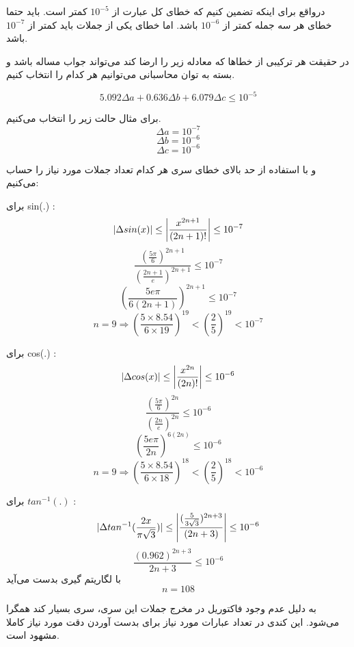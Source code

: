 درواقع برای اینکه تضمین کنیم که خطای کل عبارت از $10^{-5}$ کمتر است. باید حتما خطای هر سه جمله کمتر از $10^{-6}$ باشد. اما خطای یکی از جملات باید کمتر از $10^{-7}$ باشد.

در حقیقت هر ترکیبی از خطاها که معادله زیر را ارضا کند می‌تواند جواب مساله باشد و بسته به توان محاسبانی می‌توانیم هر کدام را انتخاب کنیم.

$$5.092 \Delta a + 0.636 \Delta b + 6.079 \Delta c  \leq 10^{-5}$$

برای مثال حالت زیر را انتخاب می‌کنیم.
$$\Delta a  = 10^{-7}$$
$$\Delta b = 10^{-6}$$
$$\Delta c = 10^{-6}$$

و با استفاده از حد بالای خطای سری هر کدام تعداد جملات مورد نیاز را حساب می‌کنیم:

برای sin(.) :
$$|\Delta sin(x)| \leq \abs{\frac{x^{2n+1}}{(2n+1)!}} \leq 10^{-7}$$
$$\frac{(\frac{5\pi}{6})^{2n+1}}{(\frac{2n+1}{e})^{2n+1}} \leq 10^{-7}$$
$$(\frac{5e\pi}{6(2n+1)})^{2n+1} \leq 10^{-7}$$
$$n=9 \Rightarrow (\frac{5 \times 8.54}{6 \times 19})^{19} < (\frac{2}{5})^{19} < 10^{-7}$$

برای cos(.) : 
$$|\Delta cos(x)| \leq \abs{\frac{x^{2n}}{(2n)!}} \leq 10^{-6}$$
$$\frac{(\frac{5\pi}{6})^{2n}}{(\frac{2n}{e})^{2n}} \leq 10^{-6}$$
$$(\frac{5e\pi}{2n})^{6(2n)} \leq 10^{-6}$$
$$n=9 \Rightarrow (\frac{5 \times 8.54}{6 \times 18})^{18} < (\frac{2}{5})^{18} < 10^{-6}$$

برای $tan^{-1}(.)$ :
$$|\Delta tan^{-1}(\frac{2x}{\pi \sqrt{3}})| \leq \abs{\frac{(\frac{5}{3\sqrt{3}})^{2n+3}}{(2n+3)}} \leq 10^{-6}$$
$$\frac{(0.962)^{2n+3}}{2n+3} \leq 10^{-6}$$
با لگاریتم گیری بدست می‌آید
$$n=108$$

به دلیل عدم وجود فاکتوریل در مخرج جملات این سری، سری بسیار کند همگرا می‌شود. این کندی در تعداد عبارات مورد نیاز برای بدست آوردن دقت مورد نیاز کاملا مشهود است.

